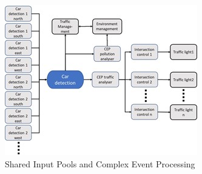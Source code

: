 \begin{figure}[htbp]
	\centering
	\includegraphics[width=0.7\linewidth]{Figures/Chapter5/figuresshared/SharedInputPoolEvent.jpg}
	\caption[Shared Input Pools and Complex Event Processing]{Shared Input Pools and Complex Event Processing}
	\label{fig:sharedInputPoolEvents}
\end{figure}

